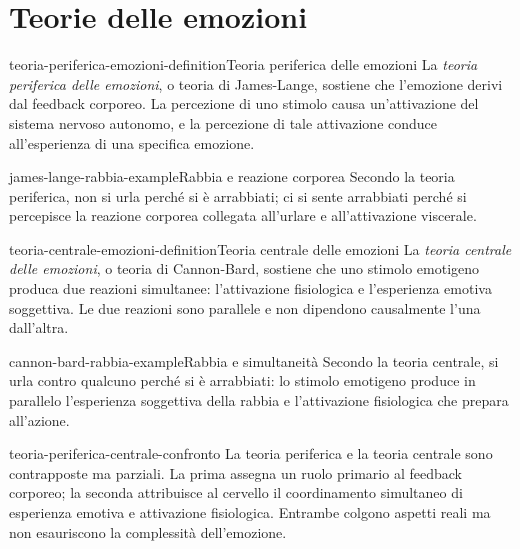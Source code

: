 \documentclass[preview]{standalone}
\begin{document}
\genpage

\section{Teorie delle emozioni}

\begin{snippetdefinition}{teoria-periferica-emozioni-definition}{Teoria periferica delle emozioni}
    La \emph{teoria periferica delle emozioni}, o teoria di James-Lange,
    sostiene che l'emozione derivi dal feedback corporeo. La percezione di uno
    stimolo causa un'attivazione del sistema nervoso autonomo, e la percezione
    di tale attivazione conduce all'esperienza di una specifica emozione.
\end{snippetdefinition}

\begin{snippetexample}{james-lange-rabbia-example}{Rabbia e reazione corporea}
    Secondo la teoria periferica, non si urla perché si è arrabbiati; ci si
    sente arrabbiati perché si percepisce la reazione corporea collegata
    all'urlare e all'attivazione viscerale.
\end{snippetexample}

\begin{snippetdefinition}{teoria-centrale-emozioni-definition}{Teoria centrale delle emozioni}
    La \emph{teoria centrale delle emozioni}, o teoria di Cannon-Bard, sostiene
    che uno stimolo emotigeno produca due reazioni simultanee: l'attivazione
    fisiologica e l'esperienza emotiva soggettiva. Le due reazioni sono
    parallele e non dipendono causalmente l'una dall'altra.
\end{snippetdefinition}

\begin{snippetexample}{cannon-bard-rabbia-example}{Rabbia e simultaneità}
    Secondo la teoria centrale, si urla contro qualcuno perché si è arrabbiati:
    lo stimolo emotigeno produce in parallelo l'esperienza soggettiva della
    rabbia e l'attivazione fisiologica che prepara all'azione.
\end{snippetexample}

\begin{snippet}{teoria-periferica-centrale-confronto}
    La teoria periferica e la teoria centrale sono contrapposte ma parziali. La
    prima assegna un ruolo primario al feedback corporeo; la seconda attribuisce
    al cervello il coordinamento simultaneo di esperienza emotiva e attivazione
    fisiologica. Entrambe colgono aspetti reali ma non esauriscono la complessità
    dell'emozione.
\end{snippet}
\end{document}
